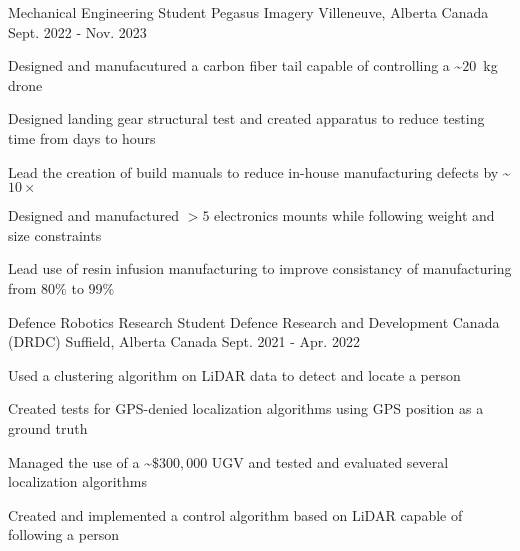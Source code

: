\begin{cventries}
\cventry
{Mechanical Engineering Student} %
{Pegasus Imagery} %
{Villeneuve, Alberta Canada} %
{Sept. 2022 - Nov. 2023} %
{
  \begin{cvitems} %
    \item Designed and manufacutured a carbon fiber tail capable of controlling a \~$20$~kg drone
    \item Designed landing gear structural test and created apparatus to reduce testing time from days to hours 
    \item Lead the creation of build manuals to reduce in-house manufacturing defects by \~$10 \times$
    \item Designed and manufactured $> 5$ electronics mounts while following weight and size constraints
    \item Lead use of resin infusion manufacturing to improve consistancy of manufacturing from $80\%$ to $99\%$
  \end{cvitems}
  }
  
    \cventry
      {Defence Robotics Research Student} %
      {Defence Research and Development Canada (DRDC)} %
      {Suffield, Alberta Canada} %
      {Sept. 2021 - Apr. 2022} %
      {
        \begin{cvitems} %
          \item Used a clustering algorithm on LiDAR data to detect and locate a person 
          \item Created tests for GPS-denied localization algorithms using GPS position as a ground truth  
          \item Managed the use of a \~$\$300,000$ UGV and tested and evaluated several localization algorithms
          \item Created and implemented a control algorithm based on LiDAR capable of following a person
        \end{cvitems}
      }


\end{cventries}
